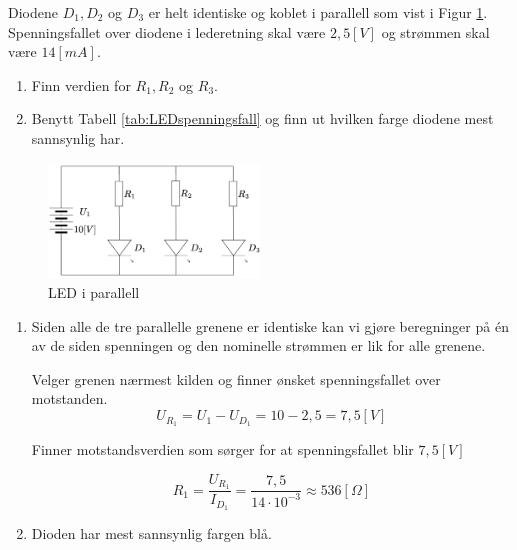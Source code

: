 \begin{question}[name=Oppgave, topic=LEDdioder]
Diodene $D_1,D_2$ og $D_3$ er helt identiske og koblet i parallell som vist i Figur \ref{fig:LEDpara}. Spenningsfallet over diodene i lederetning skal være $2,5[V]$ og strømmen skal være $14 [mA]$.


\begin{enumerate}[label=\roman*)]
	\item Finn verdien for $R_1, R_2$ og $R_3$.
	\item Benytt Tabell \ref{tab:LEDspenningsfall} og finn ut hvilken farge diodene mest sannsynlig har.
\end{enumerate}


	\begin{figure}[H]
	\centering
	\includegraphics[width=0.5\textwidth]{diode/figurer/LEDparallell.png}
	\caption{LED i parallell}
	\label{fig:LEDpara}
\end{figure}
\end{question}

\vspace{0.5cm} %

\begin{solution}[name=Løsningsforslag oppgave]
	\begin{enumerate}[label=\roman*)]
		\item Siden alle de tre parallelle grenene er identiske kan vi gjøre beregninger på én av de siden spenningen og den nominelle strømmen er lik for alle grenene.

		Velger grenen nærmest kilden og finner ønsket spenningsfallet over motstanden.
		\[U_{R_{1}}=U_1-U_{D_{1}}=10-2,5=7,5 [V]\]

		Finner motstandsverdien som sørger for at spenningsfallet blir $7,5 [V]$

		\[R_1=\frac{U_{R_{1}}}{I_{D_{1}}}=\frac{7,5}{14 \cdot 10^{-3}} \approx 536 [\Omega] \]
		\item Dioden har mest sannsynlig fargen blå.
	\end{enumerate}

\end{solution}
\vspace{0.5cm} %


